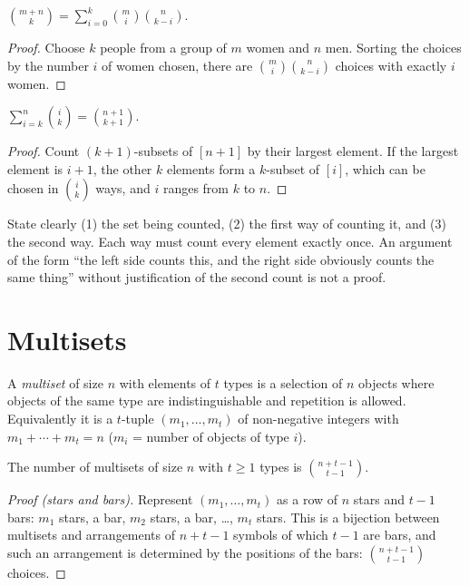 \begin{theorem}
$\displaystyle \binom{m+n}{k} = \sum_{i=0}^{k} \binom{m}{i}\binom{n}{k-i}$.
\end{theorem}
\begin{proof}
Choose $k$ people from a group of $m$ women and $n$ men. Sorting the choices by the number $i$
of women chosen, there are $\binom{m}{i}\binom{n}{k-i}$ choices with exactly $i$ women.
\end{proof}

\begin{theorem}
$\displaystyle \sum_{i=k}^{n} \binom{i}{k} = \binom{n+1}{k+1}$.
\end{theorem}
\begin{proof}
Count $(k+1)$-subsets of $[n+1]$ by their largest element. If the largest element is $i+1$,
the other $k$ elements form a $k$-subset of $[i]$, which can be chosen in $\binom{i}{k}$ ways,
and $i$ ranges from $k$ to $n$.
\end{proof}

\begin{important}
State clearly (1) the set being counted, (2) the first way of counting it, and (3) the second
way. Each way must count every element exactly once. An argument of the form ``the left side
counts this, and the right side obviously counts the same thing'' without justification of the
second count is not a proof.
\end{important}

\section{Multisets}

\begin{definition}[Multiset]
A \emph{multiset} of size $n$ with elements of $t$ types is a selection of $n$ objects where
objects of the same type are indistinguishable and repetition is allowed. Equivalently it is a
$t$-tuple $(m_1, \dots, m_t)$ of non-negative integers with $m_1 + \cdots + m_t = n$
($m_i$ = number of objects of type $i$).
\end{definition}

\begin{theorem}
The number of multisets of size $n$ with $t \ge 1$ types is
$\displaystyle \binom{n+t-1}{t-1}$.
\end{theorem}
\begin{proof}[Proof (stars and bars)]
Represent $(m_1,\dots,m_t)$ as a row of $n$ stars and $t-1$ bars: $m_1$ stars, a bar, $m_2$
stars, a bar, \dots, $m_t$ stars. This is a bijection between multisets and arrangements of
$n+t-1$ symbols of which $t-1$ are bars, and such an arrangement is determined by the positions
of the bars: $\binom{n+t-1}{t-1}$ choices.
\end{proof}

